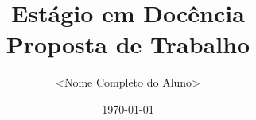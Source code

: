 \documentclass[12pt, a4paper]{article}
\title{\textbf{Estágio em Docência \\ Proposta de Trabalho}}
\author{<Nome Completo do Aluno>}
\date{\today}
\begin{document}
\begin{comment}

## Moodle

- Enviar a proposta de trabalho no formato PDF pelo Moodle com o nome `<NomeDoAluno>.pdf`
- Ao enviar a proposta, o aluno deve também encaminhar uma mensagem ao coordenador da disciplina por e-mail, incluindo o professor responsável pela disciplina em cópia, de modo a informá-lo da submissão da proposta. A proposta de trabalho será avaliada pelo coordenador da disciplina, compondo a nota final da disciplina ED I/II.

===

## Diretrizes Gerais:

4. Proposta de trabalho: é definida uma data para que o estagiário encaminhe uma proposta de trabalho ao coordenador da disciplina, em que conste também o tipo de atividade a ser conduzida, em comum acordo com o professor responsável pela turma à qual foi alocado.

---

A proposta de trabalho deverá ser previamente acertada com o professor responsável pela turma à qual o estagiário foi alocado, e submetida no Moodle da disciplina em um arquivo PDF (usar o nome NomeCompletoDoAluno.pdf).

A proposta deve conter os seguintes itens:

1. Identificação: Título, Disciplina, Professor responsável pela turma
2. Sobre a Disciplina: Descrição da forma de condução da disciplina adotada pelo professor responsável. Ementa e programa da disciplina. Bibliografia adotada. Formas de avaliação.
3. Atividades: Indicação das atividades e tarefas que ficarão sob a responsabilidade do estagiário.
4. Cronograma: Cronograma de aulas e avaliações, indicando a participação do estagiário ao longo do tempo.

Ao enviar a proposta, o aluno deve também encaminhar uma mensagem ao coordenador da disciplina por e-mail, incluindo o professor responsável pela disciplina em cópia, de modo a informá-lo da submissão da proposta.

A proposta de trabalho será avaliada pelo coordenador da disciplina, compondo a nota final da disciplina ED I/II.

---

### Critérios de Avaliação

A avaliação será feita considerando o planejamento e as atividades realizadas ao longo do semestre. Os critérios são os seguintes:

- Proposta de trabalho: 50 pontos (coordenador da disciplina ED)
  - Conhecimento da disciplina apoiada
  - Planejamento das atividades
  - Atendimento ao conteúdo previsto
\end{comment}
\end{document}
